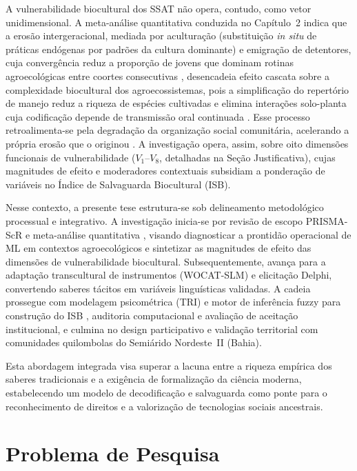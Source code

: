A vulnerabilidade biocultural dos SSAT não opera, contudo, como vetor unidimensional. A meta-análise quantitativa conduzida no Capítulo~2 indica que a erosão intergeracional, mediada por aculturação (substituição \textit{in situ} de práticas endógenas por padrões da cultura dominante) e emigração de detentores, cuja convergência reduz a proporção de jovens que dominam rotinas agroecológicas entre coortes consecutivas \cite{ReyesGarcia2013,GomezBaggethun2013}, desencadeia efeito cascata sobre a complexidade biocultural dos agroecossistemas, pois a simplificação do repertório de manejo reduz a riqueza de espécies cultivadas e elimina interações solo-planta cuja codificação depende de transmissão oral continuada \cite{Jarvis2008}. Esse processo retroalimenta-se pela degradação da organização social comunitária, acelerando a própria erosão que o originou \cite{Agrawal2002}. A investigação opera, assim, sobre oito dimensões funcionais de vulnerabilidade ($V_{1}$--$V_{8}$, detalhadas na Seção Justificativa), cujas magnitudes de efeito e moderadores contextuais subsidiam a ponderação de variáveis no Índice de Salvaguarda Biocultural (ISB).

Nesse contexto, a presente tese estrutura-se sob delineamento metodológico processual e integrativo. A investigação inicia-se por revisão de escopo PRISMA-ScR e meta-análise quantitativa \cite{Tricco2018b,Page2021}, visando diagnosticar a prontidão operacional de ML em contextos agroecológicos e sintetizar as magnitudes de efeito das dimensões de vulnerabilidade biocultural. Subsequentemente, avança para a adaptação transcultural de instrumentos (WOCAT-SLM) e elicitação Delphi, convertendo saberes tácitos em variáveis linguísticas validadas. A cadeia prossegue com modelagem psicométrica (TRI) e motor de inferência fuzzy para construção do ISB \cite{Zadeh1965}, auditoria computacional e avaliação de aceitação institucional, e culmina no design participativo e validação territorial com comunidades quilombolas do Semiárido Nordeste~II (Bahia).

Esta abordagem integrada visa superar a lacuna entre a riqueza empírica dos saberes tradicionais e a exigência de formalização da ciência moderna, estabelecendo um modelo de decodificação e salvaguarda como ponte para o reconhecimento de direitos e a valorização de tecnologias sociais ancestrais.


\section{Problema de Pesquisa}

